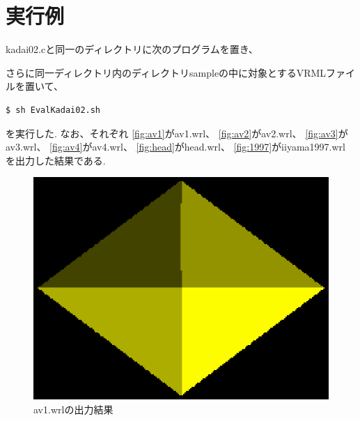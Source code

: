 \documentclass[a4j,dvipdfmx]{jsarticle}
\begin{document}
\section{実行例}
kadai02.cと同一のディレクトリに次のプログラムを置き、

さらに同一ディレクトリ内のディレクトリsampleの中に対象とするVRMLファイルを置いて、
\begin{lstlisting}
$ sh EvalKadai02.sh
\end{lstlisting}
を実行した.
なお、それぞれ
\ref{fig:av1}がav1.wrl、
\ref{fig:av2}がav2.wrl、
\ref{fig:av3}がav3.wrl、
\ref{fig:av4}がav4.wrl、
\ref{fig:head}がhead.wrl、
\ref{fig:1997}がiiyama1997.wrl
を出力した結果である.

\begin{figure}[p]
  \begin{center}
        \includegraphics[clip,scale=0.5]{images/Kadai02ForAv1.eps}
        \caption{av1.wrlの出力結果}
        \label{av1}
  \end{center}
\end{figure}
\end{document}
